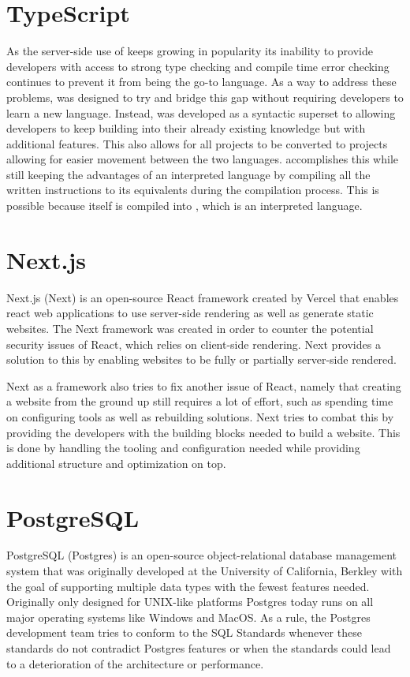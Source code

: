 \section*{TypeScript}
As the server-side use of \javascript{} keeps growing in popularity its inability to provide developers with access to strong type checking and compile time error checking continues to prevent it from being the go-to language.
As a way to address these problems, \typescript{} was designed to try and bridge this gap without requiring developers to learn a new language.
Instead, \typescript{} was developed as a syntactic superset to \javascript{} allowing developers to keep building into their already existing knowledge but with additional features. 
This also allows for all \javascript{} projects to be converted to \typescript{} projects allowing for easier movement between the two languages\cite{TypeScript}. 
\typescript{} accomplishes this while still keeping the advantages of an interpreted language by compiling all the written instructions to its \javascript{} equivalents during the compilation process. 
This is possible because \typescript{} itself is compiled into \javascript{}, which is an interpreted language. 

\section*{Next.js}
Next.js (Next) is an open-source React framework created by Vercel that enables react web applications to use server-side rendering as well as generate static websites. The Next framework was created in order to counter the potential security issues of React, which relies on client-side rendering. Next provides a solution to this by enabling websites to be fully or partially server-side rendered\cite {Nextjs_Docks}. 

Next as a framework also tries to fix another issue of React, namely that creating a website from the ground up still requires a lot of effort, such as spending time on configuring tools as well as rebuilding solutions. 
Next tries to combat this by providing the developers with the building blocks needed to build a website.
This is done by handling the tooling and configuration needed while providing additional structure and optimization on top\cite{Nextjs_Docks}.


\section*{PostgreSQL}
PostgreSQL (Postgres) is an open-source object-relational database management system that was originally developed at the University of California, Berkley with the goal of supporting multiple data types with the fewest features needed. Originally only designed for UNIX-like platforms Postgres today runs on all major operating systems like Windows and MacOS\cite{Postgres_Docs}.
As a rule, the Postgres development team tries to conform to the SQL Standards whenever these standards do not contradict Postgres features or when the standards could lead to a deterioration of the architecture or performance\cite{Postgres_Docs}. 

